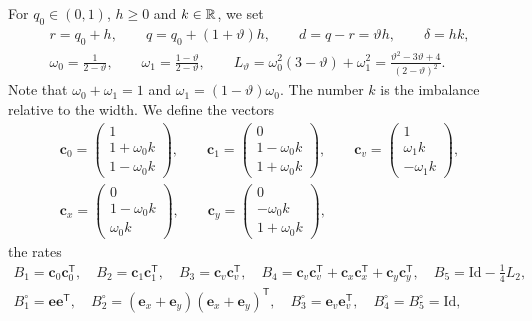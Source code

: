 For $q_0\in(0,1)$, $h\ge0$ and $k\in\mathbb R$, we set
\begin{equation}\label{b:eq:os-parameters}
\begin{gathered}
 r=q_0+h,\qquad q=q_0+(1+\vartheta)h,\qquad d=q-r=\vartheta h,
 \qquad \delta=hk,\\
 \omega_0=\frac1{2-\vartheta},\qquad \omega_1=\frac{1-\vartheta}{2-\vartheta},
 \qquad L_\vartheta=\omega_0^2(3-\vartheta)+\omega_1^2
 =\frac{\vartheta^2-3\vartheta+4}{(2-\vartheta)^2}.
\end{gathered}
\end{equation}
Note that $\omega_0+\omega_1=1$ and $\omega_1=(1-\vartheta)\omega_0$. The number $k$
is the imbalance relative to the width. We define the vectors
\[
\begin{gathered}
 \mathbf c_0=\begin{pmatrix}1\\1+\omega_0k\\1-\omega_0k\end{pmatrix},\qquad
 \mathbf c_1=\begin{pmatrix}0\\1-\omega_0k\\1+\omega_0k\end{pmatrix},\qquad
 \mathbf c_v=\begin{pmatrix}1\\\omega_1k\\-\omega_1k\end{pmatrix},\\
 \mathbf c_x=\begin{pmatrix}0\\1-\omega_0k\\\omega_0k\end{pmatrix},\qquad
 \mathbf c_y=\begin{pmatrix}0\\-\omega_0k\\1+\omega_0k\end{pmatrix},
\end{gathered}
\]
the rates
\begin{equation}\label{eq:cub-rates}
\begin{gathered}
 B_1=\mathbf c_0\mathbf c_0^{\mathsf T},\quad
 B_2=\mathbf c_1\mathbf c_1^{\mathsf T},\quad
 B_3=\mathbf c_v\mathbf c_v^{\mathsf T},\quad
 B_4=\mathbf c_v\mathbf c_v^{\mathsf T}+\mathbf c_x\mathbf c_x^{\mathsf T}
   +\mathbf c_y\mathbf c_y^{\mathsf T},\quad
 B_5=\mathrm{Id}-\tfrac14L_2,\\
 B_1^\circ=\mathbf e\mathbf e^{\mathsf T},\quad
 B_2^\circ=(\mathbf e_x+\mathbf e_y)(\mathbf e_x+\mathbf e_y)^{\mathsf T},\quad
 B_3^\circ=\mathbf e_v\mathbf e_v^{\mathsf T},\quad
 B_4^\circ=B_5^\circ=\mathrm{Id},
\end{gathered}
\end{equation}
